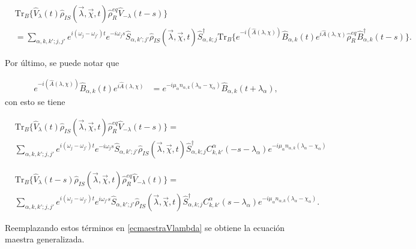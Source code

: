 \begin{appendixs}
\begin{align*}
   & \text{Tr}_{B}\{ \hat{V}_{\lambda}(t)\hat{\rho}_{IS}(\vec{\lambda},\vec{\chi},t)\hat{\rho}_{R}^{eq}\hat{V}_{-\lambda}(t-s) \} \\
   & = \sum_{\alpha,k,k';j,j'}e^{i(\omega_{j}-\omega_{j'})t}e^{-i\omega_{j}s}\hat{S}_{\alpha,k';j'}\hat{\rho}_{IS}(\vec{\lambda},\vec{\chi},t)\hat{S}^{\dagger}_{\alpha,k;j} \text{Tr}_{B}\{e^{-i(\hat{A}(\lambda,\chi))} \hat{B}_{\alpha,k}(t)e^{i\hat{A}(\lambda,\chi)}\hat{\rho}_{R}^{eq}\hat{B}^{\dagger}_{\alpha,k}(t-s) \}.
\end{align*}

Por último, se puede notar que 

\begin{align*}
    e^{-i(\hat{A}(\lambda,\chi))} \hat{B}_{\alpha,k}(t)e^{i\hat{A}(\lambda,\chi)} & = e^{-i\mu_{\alpha}n_{\alpha,k}(\lambda_{\alpha}-\chi_{\alpha})} \hat{B}_{\alpha,k}(t+\lambda_{\alpha}), 
\end{align*}
con esto se tiene

\begin{align*}
 & \text{Tr}_{B}\{ \hat{V}_{\lambda}(t)\hat{\rho}_{IS}(\vec{\lambda},\vec{\chi},t)\hat{\rho}_{R}^{eq}\hat{V}_{-\lambda}(t-s) \} = \\
 & \sum_{\alpha,k,k';j,j'}e^{i(\omega_{j}-\omega_{j'})t}e^{-i\omega_{j}s}\hat{S}_{\alpha,k';j'}\hat{\rho}_{IS}(\vec{\lambda},\vec{\chi},t)\hat{S}^{\dagger}_{\alpha,k;j} C^{\alpha}_{k,k'}(-s-\lambda_{\alpha})e^{-i\mu_{\alpha}n_{\alpha,k}(\lambda_{\alpha}-\chi_{\alpha})}
 \end{align*}

 \begin{align*}
    & \text{Tr}_{B}\{ \hat{V}_{\lambda}(t-s)\hat{\rho}_{IS}(\vec{\lambda},\vec{\chi},t)\hat{\rho}_{R}^{eq}\hat{V}_{-\lambda}(t) \} = \\
    & \sum_{\alpha,k,k';j,j'}e^{i(\omega_{j}-\omega_{j'})t}e^{i\omega_{j'}s}\hat{S}_{\alpha,k';j'}\hat{\rho}_{IS}(\vec{\lambda},\vec{\chi},t)\hat{S}^{\dagger}_{\alpha,k;j} C^{\alpha}_{k,k'}(s-\lambda_{\alpha})e^{-i\mu_{\alpha}n_{\alpha,k}(\lambda_{\alpha}-\chi_{\alpha})}.
    \end{align*}
   
Reemplazando estos términos en \ref{ecmaestraVlambda} se obtiene la ecuación maestra generalizada.   

\label{finalequation}

\newpage


\end{appendixs}
